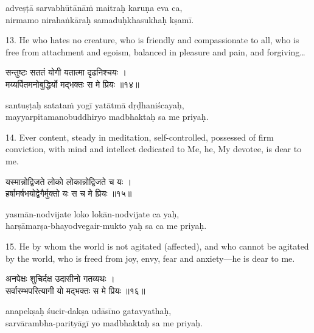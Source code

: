 \begin{transliteration}
adveṣṭā sarvabhūtānāṁ maitraḥ karuṇa eva ca, \\
nirmamo nirahaṅkāraḥ samaduḥkhasukhaḥ kṣamī.
\end{transliteration}

13. He who hates no creature, who is friendly and compassionate to all, who is
free from attachment and egoism, balanced in pleasure and pain, and
forgiving\ldots

\begin{gitaverse}
सन्तुष्टः सततं योगी यतात्मा दृढनिश्चयः । \\
मय्यर्पितमनोबुद्धिर्यो मद्भक्तः स मे प्रियः ॥१४॥
\end{gitaverse}

\begin{transliteration}
santuṣṭaḥ satataṁ yogī yatātmā dṛḍhaniścayaḥ, \\
mayyarpitamanobuddhiryo madbhaktaḥ sa me priyaḥ.
\end{transliteration}

14. Ever content, steady in meditation, self-controlled, possessed of firm
conviction, with mind and intellect dedicated to Me, he, My devotee, is dear to
me.

\begin{gitaverse}
यस्मान्नोद्विजते लोको लोकान्नोद्विजते च यः । \\
हर्षामर्षभयोद्वेगैर्मुक्तो यः स च मे प्रियः ॥१५॥
\end{gitaverse}

\begin{transliteration}
yasmān-nodvijate loko lokān-nodvijate ca yaḥ, \\
harṣāmarṣa-bhayodvegair-mukto yaḥ sa ca me priyaḥ.
\end{transliteration}

15. He by whom the world is not agitated (affected), and who cannot be agitated
by the world, who is freed from joy, envy, fear and anxiety---he is dear to me.

\begin{gitaverse}
अनपेक्षः शुचिर्दक्ष उदासीनो गतव्यथः । \\
सर्वारम्भपरित्यागी यो मद्भक्तः स मे प्रियः ॥१६॥
\end{gitaverse}

\begin{transliteration}
anapekṣaḥ śucir-dakṣa udāsīno gatavyathaḥ, \\
sarvārambha-parityāgī yo madbhaktaḥ sa me priyaḥ.
\end{transliteration}

